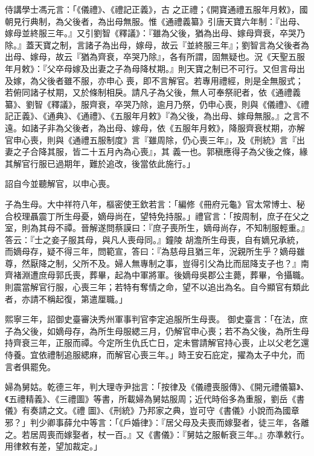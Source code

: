 \begin{pinyinscope}
 侍講學士馮元言：「《儀禮》、《禮記正義》，古
 之正禮；《開寶通禮五服年月敕》，國朝見行典制，為父後者，為出母無服。惟《通禮義纂》引唐天寶六年制：『出母、嫁母並終服三年。』又引劉智《釋議》：『雖為父後，猶為出母、嫁母齊衰，卒哭乃除。』蓋天寶之制，言諸子為出母，嫁母，故云『並終服三年』；劉智言為父後者為出母、嫁母，故云『猶為齊衰，卒哭乃除』，各有所謂，固無疑也。況《天聖五服年月敕》：『父卒母嫁及出妻之子為母降杖期。』則天寶之制已不可行。又但言母出及嫁，為父後者雖不服，亦申心
 喪，即不言解官。若專用禮經，則是全無服式；若俯同諸子杖期，又於條制相戾。請凡子為父後，無人可奉祭祀者，依《通禮義纂》、劉智《釋議》，服齊衰，卒哭乃除，逾月乃祭，仍申心喪，則與《儀禮》、《禮記正義》、《通典》、《通禮》、《五服年月敕》『為父後，為出母、嫁母無服。』之言不遠。如諸子非為父後者，為出母、嫁母，依《五服年月敕》，降服齊衰杖期，亦解官申心喪，則與《通禮五服制度》言『雖周除，仍心喪三年』，及《刑統》言『出妻之子合降其服，皆二十五月內為心喪』，其
 義一也。郭稹應得子為父後之條，緣其解官行服已過期年，難於追改，後當依此施行。」



 詔自今並聽解官，以申心喪。



 子為生母。大中祥符八年，樞密使王欽若言：「編修《冊府元龜》官太常博士、秘合校理聶震丁所生母憂，嫡母尚在，望特免持服。」禮官言：「按周制，庶子在父之室，則為其母不禫。晉解遂問蔡謨曰：『庶子喪所生，嫡母尚存，不知制服輕重。』答云：『士之妾子服其母，與凡人喪母同。』鐘陵
 胡澹所生母喪，自有嫡兄承統，而嫡母存，疑不得三年，問範宣，答曰：『為慈母且猶三年，況親所生乎？嫡母雖尊，然厭降之制，父所不及。婦人無專制之事，豈得引父為比而屈降支子也？』南齊褚淵遭庶母郭氏喪，葬畢，起為中軍將軍。後嫡母吳郡公主薨，葬畢，令攝職。則震當解官行服，心喪三年；若特有奪情之命，望不以追出為名。自今顯官有類此者，亦請不稱起復，第遣厘職。」



 熙寧三年，詔御史臺審決秀州軍事判官李定追服所生母喪。
 御史臺言：「在法，庶子為父後，如嫡母存，為所生母服緦三月，仍解官申心喪；若不為父後，為所生母持齊衰三年，正服而禫。今定所生仇氏亡日，定未嘗請解官持心喪，止以父老乞還侍養。宜依禮制追服緦麻，而解官心喪三年。」時王安石庇定，擢為太子中允，而言者俱罷免。



 婦為舅姑。乾德三年，判大理寺尹拙言：「按律及《儀禮喪服傳》、《開元禮儀纂》、《五禮精義》、《三禮圖》等書，所載婦為舅姑服周；近代時俗多為重服，劉岳《書儀》有奏請之文。《禮
 圖》、《刑統》乃邦家之典，豈可守《書儀》小說而為國章邪？」判少卿事薛允中等言：「《戶婚律》：『居父母及夫喪而嫁娶者，徒三年，各離之。若居周喪而嫁娶者，杖一百。』又《書儀》：『舅姑之服斬衰三年。』亦準敕行。用律敕有差，望加裁定。」




\end{pinyinscope}
